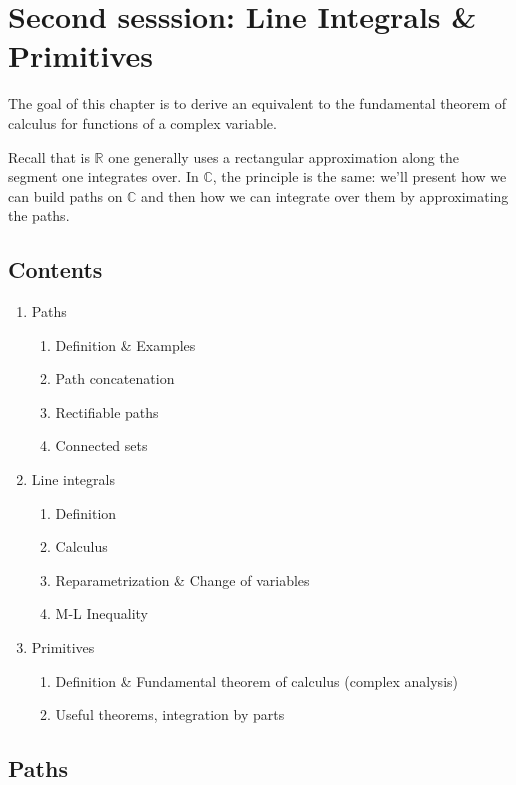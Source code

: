\section{Second sesssion: Line Integrals \& Primitives} 
The goal of this chapter is to derive an equivalent to the fundamental theorem of calculus for functions of a complex variable.

Recall that is $\mathbb{R}$ one generally uses a rectangular approximation along the segment one integrates over. In $\mathbb{C}$, the principle is the same: we'll present how we can build paths on $\mathbb{C}$ and then how we can integrate over them by approximating the paths.
\subsection*{Contents}
\begin{enumerate}
    \item Paths
        \begin{enumerate}
            \item Definition \& Examples
            \item Path concatenation
            \item Rectifiable paths
            \item Connected sets
        \end{enumerate}
    \item Line integrals 
        \begin{enumerate}
            \item Definition
            \item Calculus
            \item Reparametrization \& Change of variables
            \item M-L Inequality
        \end{enumerate}
    \item Primitives
        \begin{enumerate}
            \item Definition \& Fundamental theorem of calculus (complex analysis)
            \item Useful theorems, integration by parts
        \end{enumerate}
        
\end{enumerate}

\subsection{Paths}
